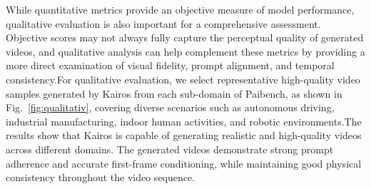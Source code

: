 \documentclass{llmxive}
\begin{document}
\begin{table}[!htbp]
\centering
{}
\caption{Evaluation on PAI-bench. For each column, the highest score is \textbf{bolded}. }
\label{tab:paibench}
\end{table}





While quantitative metrics provide an objective measure of model performance, qualitative evaluation is also important for a comprehensive assessment. Objective scores may not always fully capture the perceptual quality of generated videos, and qualitative analysis can help complement these metrics by providing a more direct examination of visual fidelity, prompt alignment, and temporal consistency.For qualitative evaluation, we select representative high-quality video samples generated by Kairos from each sub-domain of Paibench, as shown in Fig.~\ref{fig:qualitativ}, covering diverse scenarios such as autonomous driving, industrial manufacturing, indoor human activities, and robotic environments.The results show that Kairos is capable of generating realistic and high-quality videos across different domains. The generated videos demonstrate strong prompt adherence and accurate first-frame conditioning, while maintaining good physical consistency throughout the video sequence.
\end{document}
